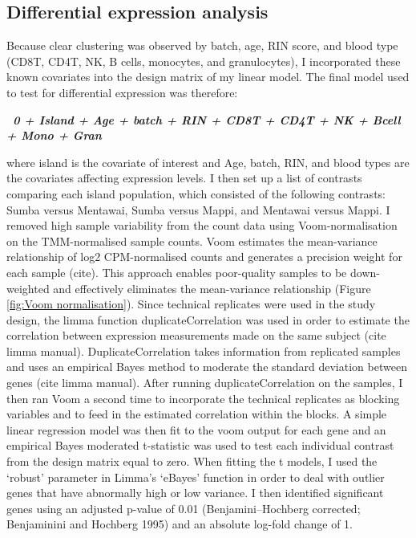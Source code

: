 \documentclass[12pt,a4paper,titlepage,twoside,openright]{book}
\begin{document}
\begin{mainmatter}
\section{Differential expression analysis}
Because clear clustering was observed by batch, age, RIN score, and blood type (CD8T, CD4T, NK, B cells, monocytes, and granulocytes), I incorporated these known covariates into the design matrix of my linear model. The final model used to test for differential expression was therefore:

\textbf{\textit{~0 + Island + Age + batch + RIN + CD8T + CD4T + NK + Bcell + Mono + Gran}}

where island is the covariate of interest and Age, batch, RIN, and blood types are the covariates affecting expression levels. I then set up a list of contrasts comparing each island population, which consisted of the following contrasts: Sumba versus Mentawai, Sumba versus Mappi, and Mentawai versus Mappi.  
I removed high sample variability from the count data using Voom-normalisation on the TMM-normalised sample counts. Voom estimates the mean-variance relationship of log2 CPM-normalised counts and generates a precision weight for each sample (cite). This approach enables poor-quality samples to be down-weighted and effectively eliminates the mean-variance relationship (﻿Figure \ref{fig:Voom normalisation}). Since technical replicates were used in the study design, the limma function duplicateCorrelation was used in order to estimate the correlation between expression measurements made on the same subject (cite limma manual). DuplicateCorrelation takes information from replicated samples and uses an empirical Bayes method to moderate the standard deviation between genes (cite limma manual). After running duplicateCorrelation on the samples, I then ran Voom a second time to incorporate the technical replicates as blocking variables and to feed in the estimated correlation within the blocks. A simple linear regression model was then fit to the voom output for each gene and an empirical Bayes moderated t-statistic was used to test each individual contrast from the design matrix equal to zero. When fitting the t models, I used the ‘robust’ parameter in Limma’s ‘eBayes’ function in order to deal with outlier genes that have abnormally high or low variance. I then identified significant genes using an adjusted p-value of 0.01 (Benjamini–Hochberg corrected; Benjaminini and Hochberg 1995) and an absolute log-fold change of 1. 


\end{mainmatter}
\end{document}
